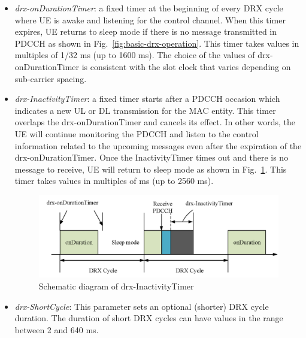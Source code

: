 \documentclass[]{IEEEtran}
\begin{document}
\begin{itemize}
    \item \textit{drx-onDurationTimer}: a fixed timer at the beginning of every DRX cycle where UE is awake and listening for the control channel.
    When this timer expires, UE returns to sleep mode if there is no message transmitted in PDCCH as shown in Fig.~\ref{fig:basic-drx-operation}.
    This timer takes values in multiples of 1/32 ms (up to 1600 ms). The choice of the values of drx-onDurationTimer is consistent with the slot clock that varies depending on sub-carrier spacing.
    \item \textit{drx-InactivityTimer}: a fixed timer starts after a PDCCH occasion which indicates a new UL or DL transmission for the MAC entity. This timer overlaps the drx-onDurationTimer and cancels its effect. 
    In other words, the UE will continue monitoring the PDCCH and listen to the control information related to the upcoming messages even after the expiration of the drx-onDurationTimer. 
    Once the InactivityTimer times out and there is no message to receive, UE will return to sleep mode as shown in Fig.~\ref{fig:5g-drx-InactivityTimer}. This timer takes values in multiples of ms (up to 2560 ms).
\begin{figure}
    \centering
    \includegraphics[width=\linewidth]{Pictures/Schematic diagram of drx-InactivityTimer.png}
    \caption{Schematic diagram of drx-InactivityTimer}
    \label{fig:5g-drx-InactivityTimer}
\end{figure}

    \item \textit{drx-ShortCycle}: This parameter sets an optional (shorter) DRX cycle duration. The duration of short DRX cycles can have values in the range between 2 and 640 ms.
    

\end{itemize}
\end{document}
